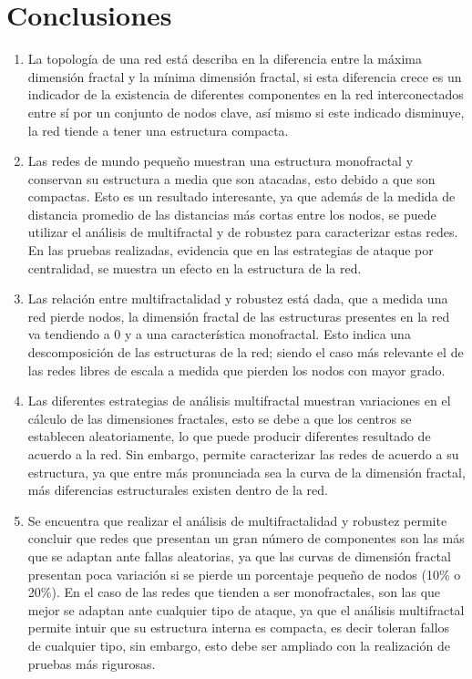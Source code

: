 \section{Conclusiones}

\begin{enumerate}
    \item La topología de una red está describa en la diferencia entre la máxima dimensión fractal y la mínima dimensión fractal, si esta diferencia crece es un indicador de la existencia de diferentes componentes en la red interconectados entre sí por un conjunto de nodos clave, así mismo si este indicado disminuye, la red tiende a tener una estructura compacta.
    \item Las redes de mundo pequeño muestran una estructura monofractal y conservan su estructura a media que son atacadas, esto debido a que son compactas. Esto es un resultado interesante, ya que además de la medida de distancia promedio de las distancias más cortas entre los nodos, se puede utilizar el análisis de multifractal y de robustez para caracterizar estas redes. En las pruebas realizadas, evidencia que en las estrategias de ataque por centralidad, se muestra un efecto en la estructura de la red.
    \item Las relación entre multifractalidad y robustez está dada, que a medida una red pierde nodos, la dimensión fractal de las estructuras presentes en la red va tendiendo a 0 y a una característica monofractal. Esto indica una descomposición de las estructuras de la red; siendo el caso más relevante el de las redes libres de escala a medida que pierden los nodos con mayor grado.
    \item Las diferentes estrategias de análisis multifractal muestran variaciones en el cálculo de las dimensiones fractales, esto se debe a que los centros se establecen aleatoriamente, lo que puede producir diferentes resultado de acuerdo a la red. Sin embargo, permite caracterizar las redes de acuerdo a su estructura, ya que entre más pronunciada sea la curva de la dimensión fractal, más diferencias estructurales existen dentro de la red.
    \item Se encuentra que realizar el análisis de multifractalidad y robustez permite concluir que redes que presentan un gran número de componentes son las más que se adaptan ante fallas aleatorias, ya que las curvas de dimensión fractal presentan poca variación si se pierde un porcentaje pequeño de nodos (10\% o 20\%). En el caso de las redes que tienden a ser monofractales, son las que mejor se adaptan ante cualquier tipo de ataque, ya que el análisis multifractal permite intuir que su estructura interna es compacta, es decir toleran fallos de cualquier tipo, sin embargo, esto debe ser ampliado con la realización de pruebas más rigurosas.

\end{enumerate}

